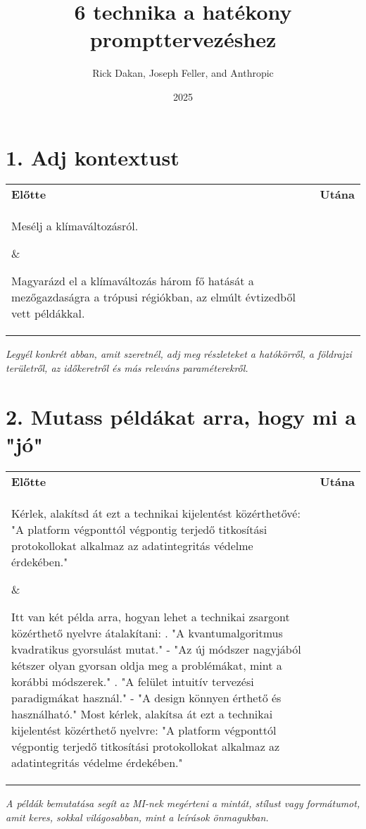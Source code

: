 \documentclass[a4paper, 11pt]{article}
\makeatletter
\renewcommand{\maketitle}{
  \begin{center}
    {\fontsize{22}{26}\bfseries\color{primary}\@title}
    \vspace{0.5em}
    {\color{lightgray}\titlerule[3pt]}
    \vspace{1.5em}
  \end{center}
}
\makeatother
\begin{document}
\title{6 technika a hatékony prompttervezéshez}
\author{Rick Dakan, Joseph Feller, and Anthropic}
\date{2025}
\maketitle

\section*{1. Adj kontextust}
\begin{tabular}{p{} p{}}
\textbf{Előtte} & \textbf{Utána} \\
\parbox[t]{0.45\textwidth}{Mesélj a klímaváltozásról.} & \parbox[t]{0.45\textwidth}{Magyarázd el a klímaváltozás három fő hatását a mezőgazdaságra a trópusi régiókban, az elmúlt évtizedből vett példákkal.} \\
\end{tabular}
\textit{Legyél konkrét abban, amit szeretnél, adj meg részleteket a hatókörről, a földrajzi területről, az időkeretről és más releváns paraméterekről.}

\section*{2. Mutass példákat arra, hogy mi a "jó"}
\begin{tabular}{p{} p{}}
\textbf{Előtte} & \textbf{Utána} \\
\parbox[t]{0.45\textwidth}{Kérlek, alakítsd át ezt a technikai kijelentést közérthetővé: "A platform végponttól végpontig terjedő titkosítási protokollokat alkalmaz az adatintegritás védelme érdekében."} & \parbox[t]{0.45\textwidth}{Itt van két példa arra, hogyan lehet a technikai zsargont közérthető nyelvre átalakítani: . "A kvantumalgoritmus kvadratikus gyorsulást mutat." - "Az új módszer nagyjából kétszer olyan gyorsan oldja meg a problémákat, mint a korábbi módszerek." . "A felület intuitív tervezési paradigmákat használ." - "A design könnyen érthető és használható." \newline Most kérlek, alakítsa át ezt a technikai kijelentést közérthető nyelvre: "A platform végponttól végpontig terjedő titkosítási protokollokat alkalmaz az adatintegritás védelme érdekében."} \\
\end{tabular}
\textit{A példák bemutatása segít az MI-nek megérteni a mintát, stílust vagy formátumot, amit keres, sokkal világosabban, mint a leírások önmagukban.}
\end{document}
